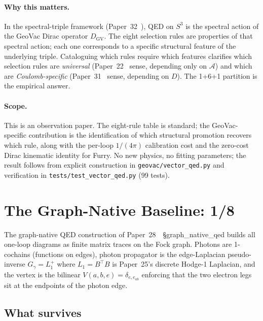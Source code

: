 \documentclass[11pt]{article}
\begin{document}
\paragraph{Why this matters.}  In the spectral-triple framework
(Paper~32~\cite{paper32}), QED on $S^3$ is the spectral action of the
GeoVac Dirac operator $D_{\mathrm{GV}}$.  The eight selection rules
are properties of that spectral action; each one corresponds to a
specific structural feature of the underlying triple.  Cataloguing
which rules require which features clarifies which selection rules are
\emph{universal} (Paper~22~\cite{paper22} sense, depending only on
$\mathcal{A}$) and which are \emph{Coulomb-specific}
(Paper~31~\cite{paper31} sense, depending on $D$).  The 1+6+1
partition is the empirical answer.

\paragraph{Scope.}  This is an observation paper.  The eight-rule
table is standard; the GeoVac-specific contribution is the
identification of which structural promotion recovers which rule,
along with the per-loop $1/(4\pi)$ calibration cost and the
zero-cost Dirac kinematic identity for Furry.  No new physics, no
fitting parameters; the result follows from explicit construction in
\texttt{geovac/vector\_qed.py} and verification in
\texttt{tests/test\_vector\_qed.py} (99 tests).

\section{The Graph-Native Baseline: 1/8}
\label{sec:graph_native_baseline}

The graph-native QED construction of
Paper~28~\cite{paper28}~\S graph\_native\_qed builds all one-loop
diagrams as finite matrix traces on the Fock graph.  Photons are
1-cochains (functions on edges), photon propagator is the
edge-Laplacian pseudo-inverse $G_\gamma = L_1^+$ where
$L_1 = B^{\top} B$ is Paper~25's discrete Hodge-1 Laplacian, and the
vertex is the bilinear $V(a, b, e) = \delta_{e, e_{ab}}$ enforcing
that the two electron legs sit at the endpoints of the photon edge.

\subsection{What survives}
\end{document}
